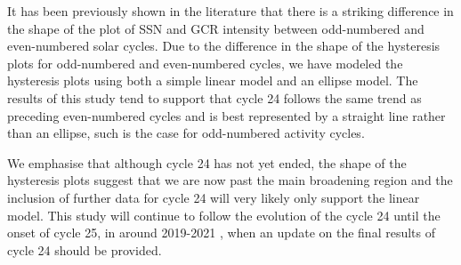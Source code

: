 It has been previously shown in the literature that there is a striking difference in the shape of the plot of SSN and GCR intensity between odd-numbered and even-numbered solar cycles. Due to the difference in the shape of the hysteresis plots for odd-numbered and even-numbered cycles, we have modeled the hysteresis plots using both a simple linear model and an ellipse model. The results of this study tend to support that cycle 24 follows the same trend as preceding even-numbered cycles and is best represented by a straight line rather than an ellipse, such is the case for odd-numbered activity cycles.

We emphasise that although cycle 24 has not yet ended, the shape of the hysteresis plots suggest that we are now past the main broadening region and the inclusion of further data for cycle 24 will very likely only support the linear model. This study will continue to follow the evolution of the cycle 24 until the onset of cycle 25, in around 2019-2021 \citep{howe_signatures_2018, upton_updated_2018, pesnell_early_2018}, when an update on the final results of cycle 24 should be provided.


